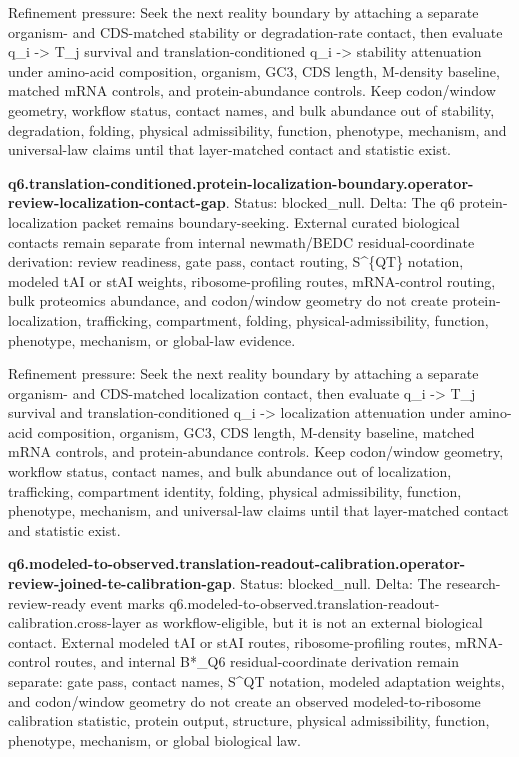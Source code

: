 Refinement pressure: Seek the next reality boundary by attaching a separate organism- and CDS-matched stability or degradation-rate contact, then evaluate q\_i -> T\_j survival and translation-conditioned q\_i -> stability attenuation under amino-acid composition, organism, GC3, CDS length, M-density baseline, matched mRNA controls, and protein-abundance controls. Keep codon/window geometry, workflow status, contact names, and bulk abundance out of stability, degradation, folding, physical admissibility, function, phenotype, mechanism, and universal-law claims until that layer-matched contact and statistic exist.

\textbf{q6.translation-conditioned.protein-localization-boundary.operator-review-localization-contact-gap}. Status: blocked\_null. Delta: The q6 protein-localization packet remains boundary-seeking. External curated biological contacts remain separate from internal newmath/BEDC residual-coordinate derivation: review readiness, gate pass, contact routing, S\textasciicircum{}\{QT\} notation, modeled tAI or stAI weights, ribosome-profiling routes, mRNA-control routing, bulk proteomics abundance, and codon/window geometry do not create protein-localization, trafficking, compartment, folding, physical-admissibility, function, phenotype, mechanism, or global-law evidence.

Refinement pressure: Seek the next reality boundary by attaching a separate organism- and CDS-matched localization contact, then evaluate q\_i -> T\_j survival and translation-conditioned q\_i -> localization attenuation under amino-acid composition, organism, GC3, CDS length, M-density baseline, matched mRNA controls, and protein-abundance controls. Keep codon/window geometry, workflow status, contact names, and bulk abundance out of localization, trafficking, compartment identity, folding, physical admissibility, function, phenotype, mechanism, and universal-law claims until that layer-matched contact and statistic exist.

\textbf{q6.modeled-to-observed.translation-readout-calibration.operator-review-joined-te-calibration-gap}. Status: blocked\_null. Delta: The research-review-ready event marks q6.modeled-to-observed.translation-readout-calibration.cross-layer as workflow-eligible, but it is not an external biological contact. External modeled tAI or stAI routes, ribosome-profiling routes, mRNA-control routes, and internal B*\_Q6 residual-coordinate derivation remain separate: gate pass, contact names, S\textasciicircum{}QT notation, modeled adaptation weights, and codon/window geometry do not create an observed modeled-to-ribosome calibration statistic, protein output, structure, physical admissibility, function, phenotype, mechanism, or global biological law.

